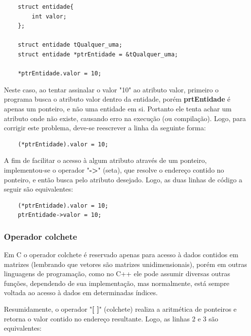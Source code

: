 \documentclass[12pt]{article}
\newcommand\tab[1][1cm]{\hspace*{#1}}
\begin{document}
\hspace{0.25cm}
\begin{lstlisting}
    struct entidade{
        int valor;
    };

    struct entidade tQualquer_uma;
    struct entidade *ptrEntidade = &tQualquer_uma;
    
    *ptrEntidade.valor = 10;
\end{lstlisting}

\par\tab Neste caso, ao tentar assinalar o valor "10" ao atributo valor, primeiro o programa busca o atributo valor dentro da entidade, porém \textbf{prtEntidade} é apenas um ponteiro, e não uma entidade em si. Portanto ele tenta achar um atributo onde não existe, causando erro na execução (ou compilação). Logo, para corrigir este problema, deve-se reescrever a linha da seguinte forma:

\hspace{0.25cm}
\begin{lstlisting}
    (*ptrEntidade).valor = 10;
\end{lstlisting}

\par\tab A fim de facilitar o acesso à algum atributo através de um ponteiro, implementou-se o operador "\textbf{->}" (seta), que resolve o endereço contido no ponteiro, e então busca pelo atributo desejado. Logo, as duas linhas de código a seguir são equivalentes:

\hspace{0.25cm}
\begin{lstlisting}
    (*ptrEntidade).valor = 10;
    ptrEntidade->valor = 10;
\end{lstlisting}

\subsubsection{Operador colchete}

\par\tab Em C o operador colchete é reservado apenas para acesso à dados contidos em matrizes (lembrando que vetores são matrizes unidimensionais), porém em outras linguagens de programação, como no C++ ele pode assumir diversas outras funções, dependendo de sua implementação, mas normalmente, está sempre voltada ao acesso à dados em determinadas índices.

\par\tab Resumidamente, o operador "\textbf{[ ]}" (colchete) realiza a aritmética de ponteiros e retorna o valor contido no endereço resultante. Logo, as linhas 2 e 3 são equivalentes:
\end{document}
